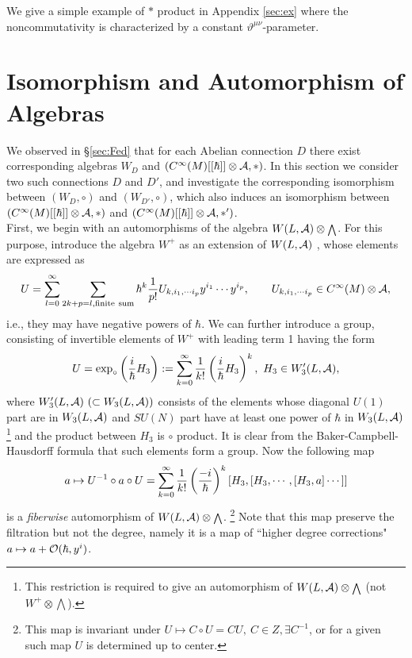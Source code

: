 \documentclass[10pt,a4paper]{article}
\def\h{\hbar}
\begin{document}
We give a simple example of $*$ product in Appendix \ref{sec:ex}
where the noncommutativity is characterized by a constant $\vartheta^{\mu\nu}$-parameter.



\section{Isomorphism and Automorphism of Algebras
\label{sec:Iso}}

We observed in \S\ref{sec:Fed} that for each Abelian connection $D$ there exist corresponding algebras $W_D$ and $(C^\infty(M)[[\h]]\otimes {\cal A},*)$. In this section we consider two such connections $D$ and $D'$, and investigate the corresponding isomorphism between $(W_D,\circ)$ and $(W_{D'},\circ)$, which also induces an isomorphism between $(C^\infty(M)[[\h]]\otimes {\cal A},*)$ and $(C^\infty(M)[[\h]]\otimes {\cal A},*')$.\\

First, we begin with an automorphisms of the algebra $W(L,{\cal A})\otimes {\scriptstyle \bigwedge}$. For this purpose, introduce the algebra $W^+$ as an extension of $W(L,{\cal A})$ \cite{Fed}, whose elements are expressed as
\begin{equation}
U=\sum_{l=0}^\infty\sum_{2k+p=l,{\rm finite\ sum}}\h^k{1\over p!}U_{k,i_1,\cdots i_p}y^{i_1}\cdots y^{i_p},\qquad  U_{k,i_1,\cdots i_p}\in C^\infty(M)\otimes {\cal A},
\end{equation}
i.e., they may have negative powers of $\h$.
We can further introduce a group, consisting of invertible elements of $W^+$ with leading term 1 having the form
\begin{equation}
\label{eqn:Udef}
U=\exp_{\circ}\left({i\over\h}H_3\right):=\sum_{k=0}^\infty{1\over k!}\left({i\over\h}H_3\right)^k,\ H_3\in W_3'(L,{\cal A}),
\end{equation}
where $W_3'(L,{\cal A}) \ (\subset W_3(L,{\cal A}))$ consists of the elements whose diagonal $U(1)$ part are in $W_3(L,{\cal A})$ and $SU(N)$ part have at least one power of $\h$ in $W_3(L,{\cal A})$\footnote{
This restriction is required to give an automorphism of $W(L,{\cal A})\otimes {\scriptstyle \bigwedge}$ (not $W^+ \otimes {\scriptstyle \bigwedge}$). } and 
the product between $H_3$ is $\circ$ product.
It is clear from the Baker-Campbell-Hausdorff formula that such elements form a group. Now the following map
\begin{equation}
a\mapsto U^{-1}\circ a\circ U=\sum_{k=0}^\infty{1\over k!}\left({-i\over\h}\right)^k [H_3,[H_3,\cdots,[H_3,a]\cdots]]
\end{equation}
is a {\it fiberwise} automorphism of $W(L,{\cal A})\otimes {\scriptstyle \bigwedge}$. \footnote{
        This map is invariant under $U\mapsto C\circ U=CU,\ C\in Z,\exists C^{-1}$, or for a given such map $U$ is determined up to center.
}
Note that this map preserve the filtration but not the degree, namely it is a map of ``higher degree corrections" $a\mapsto a+{\cal O}(\h,y^i)$. \\
\end{document}

